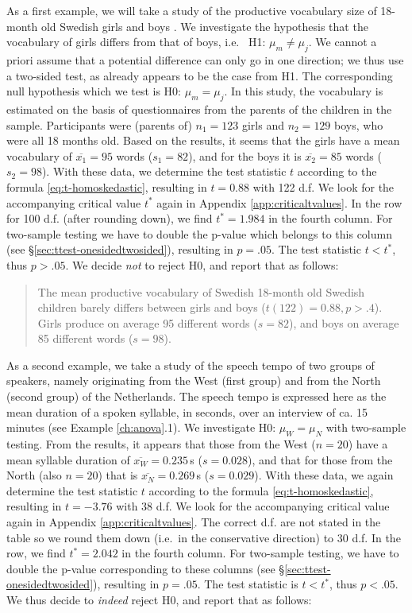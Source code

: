 \documentclass[
]{book}
\begin{document}
As a first example, we will take a study of the productive vocabulary size
of 18-month old Swedish girls and boys \citep{Ande11}. We investigate the hypothesis
that the vocabulary of girls differs from that of boys, i.e.~
H1: \(\mu_m \ne \mu_j\).
We cannot a priori assume that a potential difference can only go in one direction;
we thus use a two-sided test, as already appears to be the case from H1.
The corresponding null hypothesis which we test is H0: \(\mu_m = \mu_j\).
In this study, the vocabulary is estimated on the basis of questionnaires
from the parents of the children in the sample. Participants were
(parents of) \(n_1=123\) girls and \(n_2=129\) boys, who were all 18 months
old. Based on the results, it seems that the girls have a mean vocabulary
of \(\overline{x_1}=95\) words (\(s_1=82\)), and for the boys it is
\(\overline{x_2}=85\) words (\(s_2=98\)). With these data, we determine the
test statistic \(t\) according to the formula
\eqref{eq:t-homoskedastic}, resulting in \(t=0.88\) with 122 d.f. We look for the
accompanying critical value \(t^*\) again in Appendix
\ref{app:criticaltvalues}. In the row for 100 d.f. (after rounding down),
we find \(t^*=1.984\) in the fourth column. For two-sample testing
we have to double the p-value which belongs to this column
(see §\ref{sec:ttest-onesidedtwosided}), resulting in \(p=.05\). The
test statistic \(t < t^*\), thus \(p>.05\). We decide \emph{not} to reject
H0, and report that as follows:

\begin{quote}
The mean productive vocabulary of Swedish 18-month old Swedish children
barely differs between girls and boys
(\(t(122)=0.88, p>.4\)). Girls produce on average 95 different
words (\(s=82\)), and boys on average 85 different words
(\(s=98\)).
\end{quote}

As a second example, we take a study of the speech tempo of two groups
of speakers, namely originating from the West (first group) and
from the North (second group) of the Netherlands. The speech tempo
is expressed here as the mean duration of a spoken syllable, in seconds,
over an interview of ca. 15 minutes (see Example \ref{ch:anova}.1).
We investigate H0: \(\mu_W = \mu_N\) with
two-sample testing. From the results, it appears that those from the West
(\(n=20\)) have a mean syllable duration of
\(\overline{x_W}=0.235\) s (\(s=0.028\)), and that for those from the North (also
\(n=20\)) that is \(\overline{x_N}=0.269\) s (\(s=0.029\)). With these data,
we again determine the test statistic \(t\) according to the formula
\eqref{eq:t-homoskedastic}, resulting in \(t=-3.76\) with 38 d.f. We look for
the accompanying critical value again in Appendix
\ref{app:criticaltvalues}. The correct d.f. are not stated in the table
so we round them down (i.e.~in the conservative direction) to
30 d.f. In the row, we find \(t^*=2.042\) in the fourth column.
For two-sample testing, we have to double the p-value corresponding to
these columns (see
§\ref{sec:ttest-onesidedtwosided}), resulting in \(p=.05\). The
test statistic is \(t < t^*\), thus \(p<.05\). We thus decide
to \emph{indeed} reject H0, and report that as follows:
\end{document}
